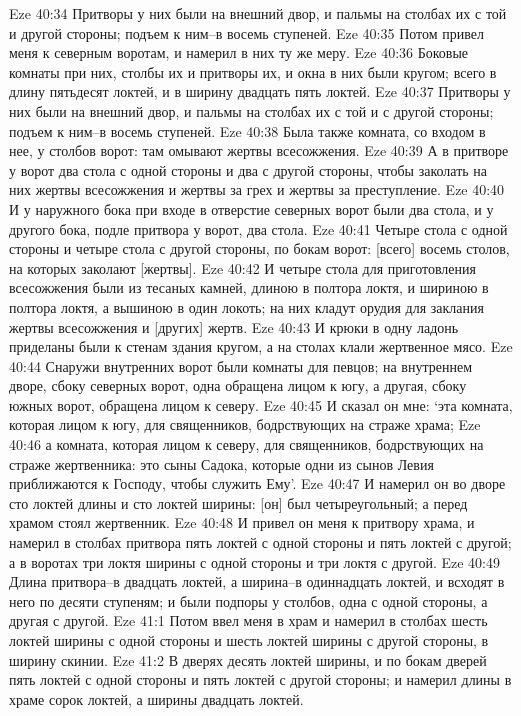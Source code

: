 Eze 40:34  Притворы у них были на внешний двор, и пальмы на столбах их с той и другой стороны; подъем к ним--в восемь ступеней.
Eze 40:35  Потом привел меня к северным воротам, и намерил в них ту же меру.
Eze 40:36  Боковые комнаты при них, столбы их и притворы их, и окна в них были кругом; всего в длину пятьдесят локтей, и в ширину двадцать пять локтей.
Eze 40:37  Притворы у них были на внешний двор, и пальмы на столбах их с той и с другой стороны; подъем к ним--в восемь ступеней.
Eze 40:38  Была также комната, со входом в нее, у столбов ворот: там омывают жертвы всесожжения.
Eze 40:39  А в притворе у ворот два стола с одной стороны и два с другой стороны, чтобы заколать на них жертвы всесожжения и жертвы за грех и жертвы за преступление.
Eze 40:40  И у наружного бока при входе в отверстие северных ворот были два стола, и у другого бока, подле притвора у ворот, два стола.
Eze 40:41  Четыре стола с одной стороны и четыре стола с другой стороны, по бокам ворот: [всего] восемь столов, на которых заколают [жертвы].
Eze 40:42  И четыре стола для приготовления всесожжения были из тесаных камней, длиною в полтора локтя, и шириною в полтора локтя, а вышиною в один локоть; на них кладут орудия для заклания жертвы всесожжения и [других] жертв.
Eze 40:43  И крюки в одну ладонь приделаны были к стенам здания кругом, а на столах клали жертвенное мясо.
Eze 40:44  Снаружи внутренних ворот были комнаты для певцов; на внутреннем дворе, сбоку северных ворот, одна обращена лицом к югу, а другая, сбоку южных ворот, обращена лицом к северу.
Eze 40:45  И сказал он мне: `эта комната, которая лицом к югу, для священников, бодрствующих на страже храма;
Eze 40:46  а комната, которая лицом к северу, для священников, бодрствующих на страже жертвенника: это сыны Садока, которые одни из сынов Левия приближаются к Господу, чтобы служить Ему'.
Eze 40:47  И намерил он во дворе сто локтей длины и сто локтей ширины: [он] был четыреугольный; а перед храмом стоял жертвенник.
Eze 40:48  И привел он меня к притвору храма, и намерил в столбах притвора пять локтей с одной стороны и пять локтей с другой; а в воротах три локтя ширины с одной стороны и три локтя с другой.
Eze 40:49  Длина притвора--в двадцать локтей, а ширина--в одиннадцать локтей, и всходят в него по десяти ступеням; и были подпоры у столбов, одна с одной стороны, а другая с другой.
Eze 41:1  Потом ввел меня в храм и намерил в столбах шесть локтей ширины с одной стороны и шесть локтей ширины с другой стороны, в ширину скинии.
Eze 41:2  В дверях десять локтей ширины, и по бокам дверей пять локтей с одной стороны и пять локтей с другой стороны; и намерил длины в храме сорок локтей, а ширины двадцать локтей.
